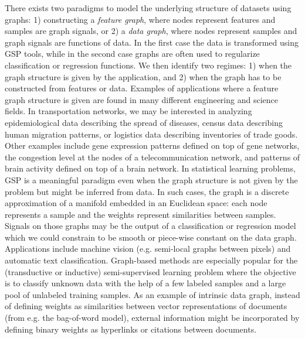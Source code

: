 \documentclass[a4paper]{scrartcl}
\begin{document}
There exists two paradigms to model the underlying structure of datasets using graphs: 1) constructing a
\textit{feature graph}, where nodes represent features and samples are graph
signals, or 2) a \textit{data graph}, where nodes represent samples and graph
signals are functions of data. In the first case the data is transformed using
GSP tools, while in the second case graphs are often used to regularize
classification or regression functions.  We then identify two regimes: 1) when
the graph structure is given by the application, and 2) when the graph has to be
constructed from features or data.
Examples of applications where a feature graph structure is given are found in
many different engineering and science fields. In transportation networks, we
may be interested in analyzing epidemiological data describing the spread of
diseases, census data describing human migration patterns, or logistics data
describing inventories of trade goods. Other examples include gene expression
patterns defined on top of gene networks, the congestion level at the nodes of a
telecommunication network, and patterns of brain activity defined on top of a
brain network.
In statistical learning problems, GSP is a meaningful paradigm even when the
graph structure is not given by the problem but might be inferred from data.  In
such cases, the graph is a discrete approximation of a manifold embedded in an
Euclidean space: each node represents a sample and the weights represent
similarities between samples. Signals on those graphs may be the output of a
classification or regression model which we could constrain to be smooth or
piece-wise constant on the data graph. Applications include machine vision (e.g.
semi-local graphs between pixels) and automatic text classification.
Graph-based methods are especially popular for the (transductive or inductive)
semi-supervised learning problem where the objective is to classify unknown data
with the help of a few labeled samples and a large pool of unlabeled training
samples.
As an example of intrinsic data graph, instead of defining weights as
similarities between vector representations of documents (from e.g. the
bag-of-word model), external information might be incorporated by defining
binary weights as hyperlinks or citations between documents.
\end{document}
